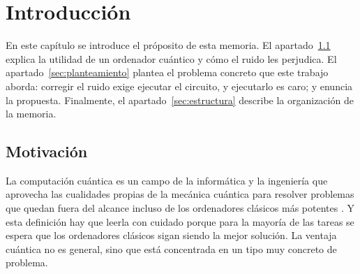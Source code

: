 \chapter{Introducción}
\label{cap:intro}

%
%
%

En este capítulo se introduce el próposito de esta memoria. El apartado~\ref{sec:motivacion} explica la utilidad de un ordenador cuántico y cómo el ruido les perjudica. El
apartado~\ref{sec:planteamiento} plantea el problema concreto que este trabajo aborda: corregir el ruido
exige ejecutar el circuito, y ejecutarlo es caro; y enuncia la propuesta. Finalmente, el
apartado~\ref{sec:estructura} describe la organización de la memoria.

\section{Motivación}
\label{sec:motivacion}


La computación cuántica es un campo de la informática y la ingeniería que aprovecha
las cualidades propias de la mecánica cuántica para resolver problemas que quedan fuera del
alcance incluso de los ordenadores clásicos más potentes \cite{ibm2026computacion}. Y esta definición
hay que leerla con cuidado porque para la mayoría de las tareas se espera que los ordenadores clásicos sigan siendo la mejor
solución. La ventaja cuántica no es general, sino que está
concentrada en un tipo muy concreto de problema.

